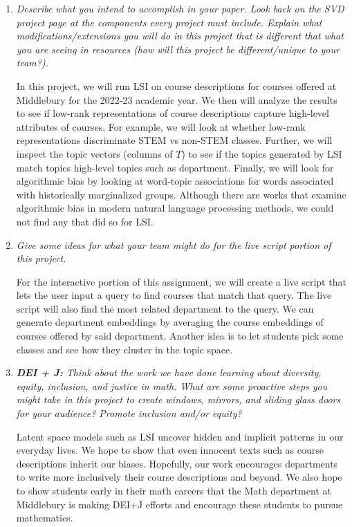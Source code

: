 \documentclass[11pt]{article}
\begin{document}
\begin{enumerate}
  \item
    \emph{Describe what you intend to accomplish in your paper.
      Look back on the SVD project page at the components every project must include.
      Explain what modifications/extensions you will do in this project that is different that what you are seeing in resources
      (how will this project be different/unique to your team?).
    }

    In this project, we will run LSI on course descriptions for courses offered at Middlebury for the 2022-23 academic year.
    We then will analyze the results to see if low-rank representations of course descriptions capture high-level attributes of courses.
    For example, we will look at whether low-rank representations discriminate STEM vs non-STEM classes.
    Further, we will inspect the topic vectors (columns of $T$) to see if the topics generated by LSI match topics high-level topics such as department.
    Finally, we will look for algorithmic bias by looking at word-topic associations for words associated with historically marginalized groups.
    Although there are works that examine algorithmic bias in modern natural language processing methods, we could not find any that did so for LSI.

	\item
    \emph{Give some ideas for what your team might do for the live script portion of this project.}

    For the interactive portion of this assignment, we will create a live script that lets the user input a query to find courses that match that query.
    The live script will also find the most related department to the query.
    We can generate department embeddings by averaging the course embeddings of courses offered by said department.
    Another idea is to let students pick some classes and see how they cluster in the topic space.

	\item
    \emph{\textbf{DEI + J:}  Think about the work we have done learning about diversity, equity, inclusion, and justice in math. 
      What are some proactive steps you might take in this project to create windows, mirrors, and sliding glass doors for your audience?
      Promote inclusion and/or equity?
    }

    Latent space models such as LSI uncover hidden and implicit patterns in our everyday lives.
    We hope to show that even innocent texts such as course descriptions inherit our biases.
    Hopefully, our work encourages departments to write more inclusively their course descriptions and beyond.
    We also hope to show students early in their math careers that the Math department at Middlebury is making DEI+J efforts and encourage these students to pursue mathematics.
\end{enumerate}
\end{document}
